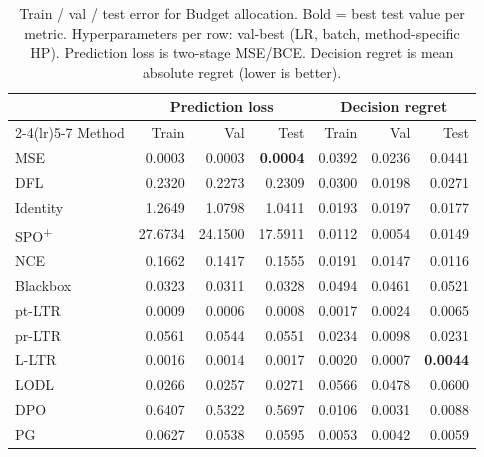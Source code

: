 \begin{table}[h]
\centering
\caption[Train/val/test error for Budget allocation.]{Train / val / test error for Budget allocation. Bold = best test value per metric. Hyperparameters per row: val-best (LR, batch, method-specific HP). Prediction loss is two-stage MSE/BCE. Decision regret is mean absolute regret (lower is better).}
\label{tab:err-budgetalloc}
\setlength{\tabcolsep}{4pt}
\renewcommand{\arraystretch}{1.05}
\begin{tabular}{@{}lrrrrrr@{}}
\toprule
& \multicolumn{3}{c}{Prediction loss} & \multicolumn{3}{c}{Decision regret} \\
\cmidrule(lr){2-4}\cmidrule(lr){5-7}
Method & Train & Val & Test & Train & Val & Test \\
\midrule
MSE & 0.0003 & 0.0003 & \textbf{0.0004} & 0.0392 & 0.0236 & 0.0441 \\
DFL & 0.2320 & 0.2273 & 0.2309 & 0.0300 & 0.0198 & 0.0271 \\
Identity & 1.2649 & 1.0798 & 1.0411 & 0.0193 & 0.0197 & 0.0177 \\
SPO\textsuperscript{+} & 27.6734 & 24.1500 & 17.5911 & 0.0112 & 0.0054 & 0.0149 \\
NCE & 0.1662 & 0.1417 & 0.1555 & 0.0191 & 0.0147 & 0.0116 \\
Blackbox & 0.0323 & 0.0311 & 0.0328 & 0.0494 & 0.0461 & 0.0521 \\
pt-LTR & 0.0009 & 0.0006 & 0.0008 & 0.0017 & 0.0024 & 0.0065 \\
pr-LTR & 0.0561 & 0.0544 & 0.0551 & 0.0234 & 0.0098 & 0.0231 \\
L-LTR & 0.0016 & 0.0014 & 0.0017 & 0.0020 & 0.0007 & \textbf{0.0044} \\
LODL & 0.0266 & 0.0257 & 0.0271 & 0.0566 & 0.0478 & 0.0600 \\
DPO & 0.6407 & 0.5322 & 0.5697 & 0.0106 & 0.0031 & 0.0088 \\
PG & 0.0627 & 0.0538 & 0.0595 & 0.0053 & 0.0042 & 0.0059 \\
\bottomrule
\end{tabular}
\end{table}

